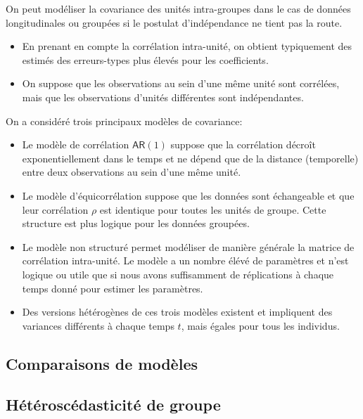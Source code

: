 \documentclass[
  11pt,
  letterpaper,
]{article}
\providecommand{\tightlist}{%
  \setlength{\itemsep}{0pt}\setlength{\parskip}{0pt}}
\theoremstyle{definition}
\theoremstyle{definition}
\theoremstyle{definition}
\theoremstyle{definition}
\theoremstyle{remark}
\begin{document}
On peut modéliser la covariance des unités intra-groupes dans le cas de données longitudinales ou groupées si le postulat d'indépendance ne tient pas la route.

\begin{itemize}
\item
  En prenant en compte la corrélation intra-unité, on obtient typiquement des estimés des erreurs-types plus élevés pour les coefficients.
\item
  On suppose que les observations au sein d'une même unité sont corrélées, mais que les observations d'unités différentes sont indépendantes.
\end{itemize}

On a considéré trois principaux modèles de covariance:

\begin{itemize}
\tightlist
\item
  Le modèle de corrélation \(\mathsf{AR}(1)\) suppose que la corrélation décroît exponentiellement dans le temps et ne dépend que de la distance (temporelle) entre deux observations au sein d'une même unité.
\item
  Le modèle d'équicorrélation suppose que les données sont échangeable et que leur corrélation \(\rho\) est identique pour toutes les unités de groupe. Cette structure est plus logique pour les données groupées.
\item
  Le modèle non structuré permet modéliser de manière générale la matrice de corrélation intra-unité. Le modèle a un nombre élévé de paramètres et n'est logique ou utile que si nous avons suffisamment de réplications à chaque temps donné pour estimer les paramètres.
\item
  Des versions hétérogènes de ces trois modèles existent et impliquent des variances différents à chaque temps \(t\), mais égales pour tous les individus.
\end{itemize}

\hypertarget{comparaisons-de-moduxe8les}{%
\subsection{Comparaisons de modèles}\label{comparaisons-de-moduxe8les}}

\hypertarget{huxe9tuxe9roscuxe9dasticituxe9-de-groupe}{%
\subsection{Hétéroscédasticité de groupe}\label{huxe9tuxe9roscuxe9dasticituxe9-de-groupe}}
\end{document}
